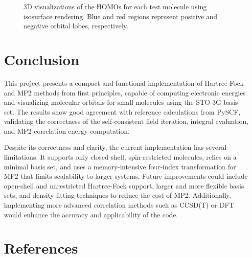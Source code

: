 \documentclass[12pt]{article}
\begin{document}
\begin{figure}[H]
    \caption{3D visualizations of the HOMOs for each test molecule using isosurface rendering. Blue and red regions represent positive and negative orbital lobes, respectively.}
\end{figure}

\section{Conclusion}

This project presents a compact and functional implementation of Hartree-Fock and MP2 methods from first principles, capable of computing electronic energies and visualizing molecular orbitals for small molecules using the STO-3G basis set. The results show good agreement with reference calculations from PySCF, validating the correctness of the self-consistent field iteration, integral evaluation, and MP2 correlation energy computation.

Despite its correctness and clarity, the current implementation has several limitations. It supports only closed-shell, spin-restricted molecules, relies on a minimal basis set, and uses a memory-intensive four-index transformation for MP2 that limits scalability to larger systems. Future improvements could include open-shell and unrestricted Hartree-Fock support, larger and more flexible basis sets, and density fitting techniques to reduce the cost of MP2. Additionally, implementing more advanced correlation methods such as CCSD(T) or DFT would enhance the accuracy and applicability of the code.

\section*{References}
\end{document}

